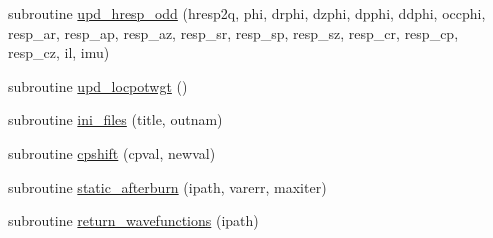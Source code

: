 \begin{DoxyCompactItemize}
\item 
subroutine \hyperlink{namespacelinresponse_a4a85727caa626cd05a3656233f05dc8d}{upd\+\_\+hresp\+\_\+odd} (hresp2q, phi, drphi, dzphi, dpphi, ddphi, occphi, resp\+\_\+ar, resp\+\_\+ap, resp\+\_\+az, resp\+\_\+sr, resp\+\_\+sp, resp\+\_\+sz, resp\+\_\+cr, resp\+\_\+cp, resp\+\_\+cz, il, imu)
\item 
subroutine \hyperlink{namespacelinresponse_ab96bf307cf27ab53f89611b635f2fa28}{upd\+\_\+locpotwgt} ()
\item 
subroutine \hyperlink{namespacelinresponse_a6b8f38f93468b890f753104248cd0f29}{ini\+\_\+files} (title, outnam)
\item 
subroutine \hyperlink{namespacelinresponse_a5340ecb0ff19e7647002c98f61fecf3c}{cpshift} (cpval, newval)
\item 
subroutine \hyperlink{namespacelinresponse_abc6223efc1cc1c1426030732e5db06f0}{static\+\_\+afterburn} (ipath, varerr, maxiter)
\item 
subroutine \hyperlink{namespacelinresponse_a654f4030a490a074dbdc40ae9af28e32}{return\+\_\+wavefunctions} (ipath)
\end{DoxyCompactItemize}

